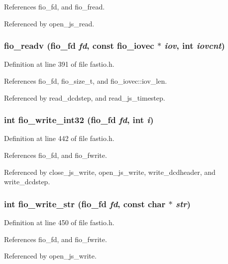 References fio\_\-fd, and fio\_\-fread.

Referenced by open\_\-js\_\-read.
\subsubsection{ fio\_\-readv ({\bf fio\_\-fd} {\em fd}, const {\bf fio\_\-iovec} $\ast$ {\em iov}, int {\em iovcnt})\hspace{0.3cm}{\tt  [static]}}\label{fastio_8h_a11}




Definition at line 391 of file fastio.h.

References fio\_\-fd, fio\_\-size\_\-t, and fio\_\-iovec::iov\_\-len.

Referenced by read\_\-dcdstep, and read\_\-js\_\-timestep.
\subsubsection{\setlength{\rightskip}{0pt plus 5cm}int fio\_\-write\_\-int32 ({\bf fio\_\-fd} {\em fd}, int {\em i})\hspace{0.3cm}{\tt  [static]}}\label{fastio_8h_a15}




Definition at line 442 of file fastio.h.

References fio\_\-fd, and fio\_\-fwrite.

Referenced by close\_\-js\_\-write, open\_\-js\_\-write, write\_\-dcdheader, and write\_\-dcdstep.
\subsubsection{\setlength{\rightskip}{0pt plus 5cm}int fio\_\-write\_\-str ({\bf fio\_\-fd} {\em fd}, const char $\ast$ {\em str})\hspace{0.3cm}{\tt  [static]}}\label{fastio_8h_a17}




Definition at line 450 of file fastio.h.

References fio\_\-fd, and fio\_\-fwrite.

Referenced by open\_\-js\_\-write.